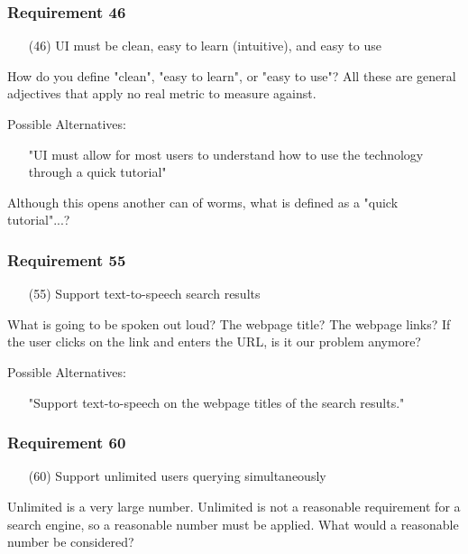 \subsubsection*{Requirement 46}
\begin{itemize}
  \item[(46)] UI must be clean, easy to learn (intuitive), and easy to use
\end{itemize}

How do you define "clean", "easy to learn", or "easy to use"? All these are general adjectives that apply no real metric to measure against.

\medskip

Possible Alternatives:
\begin{itemize}
  \item[] "UI must allow for most users to understand how to use the technology through a quick tutorial"
\end{itemize}

Although this opens another can of worms, what is defined as a "quick tutorial"...?

\subsubsection*{Requirement 55}
\begin{itemize}
  \item[(55)] Support text-to-speech search results
\end{itemize}

What is going to be spoken out loud? The webpage title? The webpage links? If the user clicks on the link and enters the URL, is it our problem anymore?

\medskip

Possible Alternatives:
\begin{itemize}
  \item[] "Support text-to-speech on the webpage titles of the search results."
\end{itemize}

\subsubsection*{Requirement 60}
\begin{itemize}
  \item[(60)] Support unlimited users querying simultaneously
\end{itemize}

Unlimited is a very large number. Unlimited is not a reasonable requirement for a search engine, so a reasonable number must be applied. What would a reasonable number be considered?

